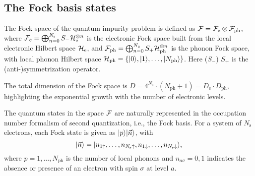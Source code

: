 \documentclass[edipack2.tex]{subfiles}
\begin{document}


















\subsection{The Fock basis states}\label{sSecBasis}
The Fock space of the quantum impurity problem is defined as
${\cal F}={\cal F}_\mathrm{e}\otimes {\cal F}_\mathrm{ph}$, where ${\cal F}_\mathrm{e}=\bigoplus_{n=0}^{N_\mathrm{s}}
S_-{\cal H}_\mathrm{e}^{\otimes n}$ is the electronic Fock space built 
from the local electronic Hilbert space ${\cal H}_\mathrm{e}$, and 
${\cal F}_\mathrm{ph}=\bigoplus_{n=0}^{N_q}S_+{\cal H}_\mathrm{ph}^{\otimes n}$
is the
phonon Fock space, with local phonon Hilbert space
${\cal H}_\mathrm{ph}=\{|0\rangle,|1\rangle,\dots,|N_\mathrm{ph}\rangle\}$. 
Here ($S_-$) $S_+$ is the (anti-)symmetrization operator.  

The total dimension of the Fock space is
$D=4^{N_\mathrm{s}}\cdot (N_\mathrm{ph}+1)=D_\mathrm{e}\cdot
D_\mathrm{ph}$, highlighting the exponential
growth with the number of electronic levels. 

The quantum states in the space ${\cal F}$ are naturally represented in
the occupation number formalism of second quantization,
i.e., the Fock basis.
For a system of $N_\mathrm{s}$ electrons, each Fock state
is given as $|p\rangle|\vec{n}\rangle$, with
\begin{equation} \label{eq:FockState_|nupndw>}
    |\vec{n}\rangle=|n_{1\uparrow},\dots,n_{N_\mathrm{s}\uparrow},n_{1\downarrow},\dots,n_{N_\mathrm{s}\downarrow}\rangle,
\end{equation}
where $p=1,\dots,N_\mathrm{ph}$ is the number of local phonons and
$n_{a\sigma}=0,1$ indicates the absence or 
presence of an electron with spin $\sigma$ at level $a$.
\end{document}
